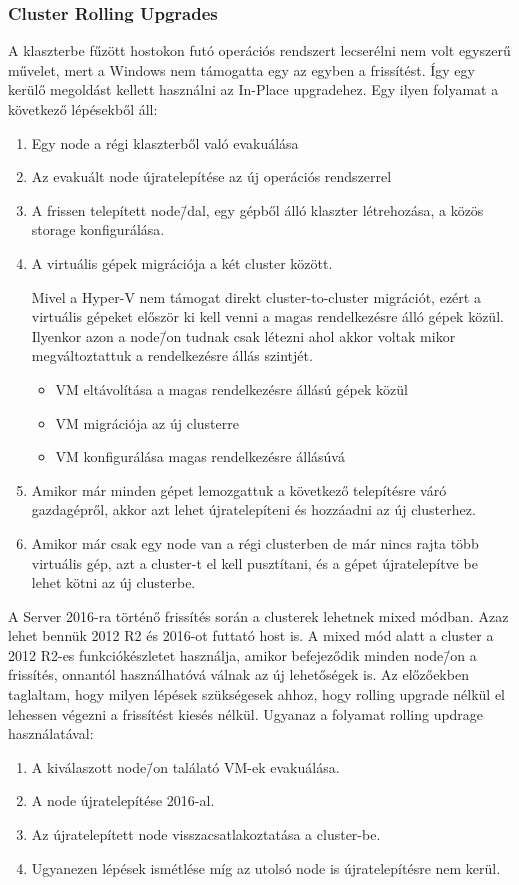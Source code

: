\documentclass[12pt,oneside,justify,table]{book}
\begin{document}
\subsubsection{Cluster Rolling Upgrades}

A klaszterbe fűzött hostokon futó operációs rendszert lecserélni nem volt egyszerű művelet, mert a Windows nem támogatta egy az egyben a frissítést. Így egy kerülő megoldást kellett használni az In-Place upgradehez. Egy ilyen folyamat a következő lépésekből áll:
\begin{enumerate}
	\item Egy node a régi klaszterből való evakuálása
	\item Az evakuált node újratelepítése az új operációs rendszerrel
	\item A frissen telepített node\=/dal, egy gépből álló klaszter létrehozása, a közös storage konfigurálása.
 	\item A virtuális gépek migrációja a két cluster között.

Mivel a Hyper-V nem támogat direkt cluster-to-cluster migrációt, ezért a virtuális gépeket először ki kell venni a magas rendelkezésre álló gépek közül. Ilyenkor azon a node\=/on tudnak csak létezni ahol akkor voltak mikor megváltoztattuk a rendelkezésre állás szintjét.
	\begin{itemize}
		
		\item VM eltávolítása a magas rendelkezésre állású gépek közül
		\item VM migrációja az új clusterre
		\item VM konfigurálása magas rendelkezésre állásúvá
	\end{itemize}
	\item Amikor már minden gépet lemozgattuk a következő telepítésre váró gazdagépről, akkor azt lehet újratelepíteni és hozzáadni az új clusterhez.
	\item Amikor már csak egy node van a régi clusterben de már nincs rajta több virtuális gép, azt a cluster-t el kell pusztítani, és a gépet újratelepítve be lehet kötni az új clusterbe.
\end{enumerate}

A Server 2016-ra történő frissítés során a clusterek lehetnek mixed módban. Azaz lehet bennük 2012 R2 és 2016-ot futtató host is. A mixed mód alatt a cluster a 2012 R2-es funkciókészletet használja, amikor befejeződik minden node\=/on a frissítés, onnantól használhatóvá válnak az új lehetőségek is. Az előzőekben taglaltam, hogy milyen lépések szükségesek ahhoz, hogy rolling upgrade nélkül el lehessen végezni a frissítést kiesés nélkül. 
Ugyanaz a folyamat rolling updrage használatával:
\begin{enumerate}
	\item A kiválaszott node\=/on találató VM-ek evakuálása.
	\item A node újratelepítése 2016-al.
	\item Az újratelepített node visszacsatlakoztatása a cluster-be. 
	\item Ugyanezen lépések ismétlése míg az utolsó node is újratelepítésre nem kerül.
\end{enumerate}
\end{document}
